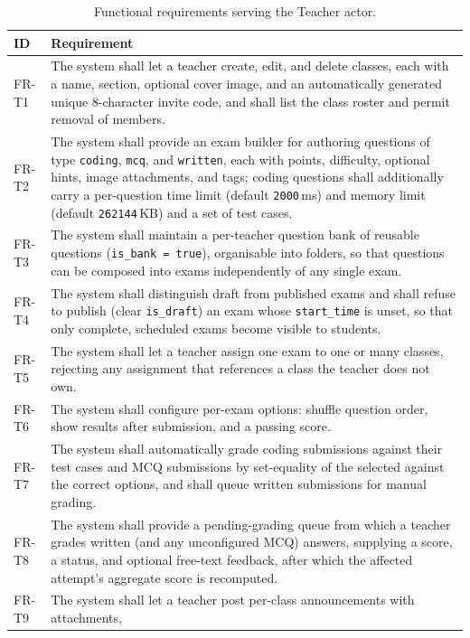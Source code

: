 \begin{table}[htbp]
\centering
\caption{Functional requirements serving the Teacher actor.}
\label{tab:fr-teacher}
\small
\begin{tabularx}{\textwidth}{@{}L{1.6cm} X@{}}
\toprule
\textbf{ID} & \textbf{Requirement} \\
\midrule
FR-T1 & The system shall let a teacher create, edit, and delete classes, each with a
name, section, optional cover image, and an automatically generated unique 8-character
invite code, and shall list the class roster and permit removal of members. \\
FR-T2 & The system shall provide an exam builder for authoring questions of type
\texttt{coding}, \texttt{mcq}, and \texttt{written}, each with points, difficulty,
optional hints, image attachments, and tags; coding questions shall additionally carry
a per-question time limit (default \texttt{2000}\,ms) and memory limit (default
\texttt{262144}\,KB) and a set of test cases. \\
FR-T3 & The system shall maintain a per-teacher question bank of reusable questions
(\texttt{is\_bank = true}), organisable into folders, so that questions can be composed
into exams independently of any single exam. \\
FR-T4 & The system shall distinguish draft from published exams and shall refuse to
publish (clear \texttt{is\_draft}) an exam whose \texttt{start\_time} is unset, so that
only complete, scheduled exams become visible to students. \\
FR-T5 & The system shall let a teacher assign one exam to one or many classes, rejecting
any assignment that references a class the teacher does not own. \\
FR-T6 & The system shall configure per-exam options: shuffle question order, show
results after submission, and a passing score. \\
FR-T7 & The system shall automatically grade coding submissions against their test cases
and MCQ submissions by set-equality of the selected against the correct options, and
shall queue written submissions for manual grading. \\
FR-T8 & The system shall provide a pending-grading queue from which a teacher grades
written (and any unconfigured MCQ) answers, supplying a score, a status, and optional
free-text feedback, after which the affected attempt's aggregate score is recomputed. \\
FR-T9 & The system shall let a teacher post per-class announcements with attachments,

\end{tabularx}
\end{table}
